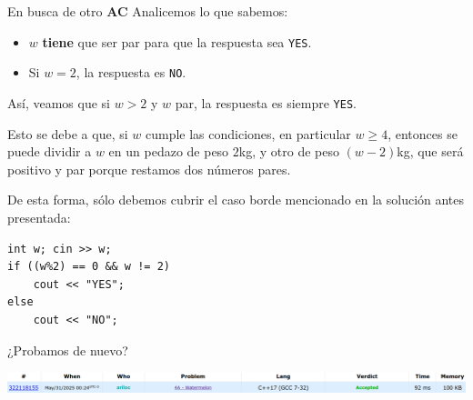 \documentclass{beamer}
\begin{document}
    \begin{frame}[fragile]{En busca de otro \textbf{AC}}
        Analicemos lo que sabemos: \pause
        \begin{itemize}
            \item $w$ \textbf{tiene} que ser par para que la respuesta sea \texttt{YES}. \pause
            \item Si $w=2$, la respuesta es \texttt{NO}. \pause
        \end{itemize}

        Así, veamos que si $w>2$ y $w$ par, la respuesta es siempre \texttt{YES}. \pause 

        Esto se debe a que, si $w$ cumple las condiciones, en particular $w \geq 4$, entonces se puede dividir a $w$ en un pedazo de peso $2$kg, y otro de peso $(w-2)$kg, que será positivo y par porque restamos dos números pares. \pause

        De esta forma, sólo debemos cubrir el caso borde mencionado en la solución antes presentada: \pause \vspace{4pt}

        \begin{minipage}{.49\linewidth}
        \begin{verbatim}
int w; cin >> w;
if ((w%2) == 0 && w != 2)
    cout << "YES";
else
    cout << "NO";
        \end{verbatim}
        \end{minipage}\pause
        \begin{minipage}{.49\linewidth}
        \begin{center}
            \LARGE
            ¿Probamos de nuevo?
        \end{center}
        \end{minipage}
        \pause

        \begin{center}
            \includegraphics[width=.95\linewidth]{./res/cf_ac.png}
        \end{center}
    \end{frame}
\end{document}
